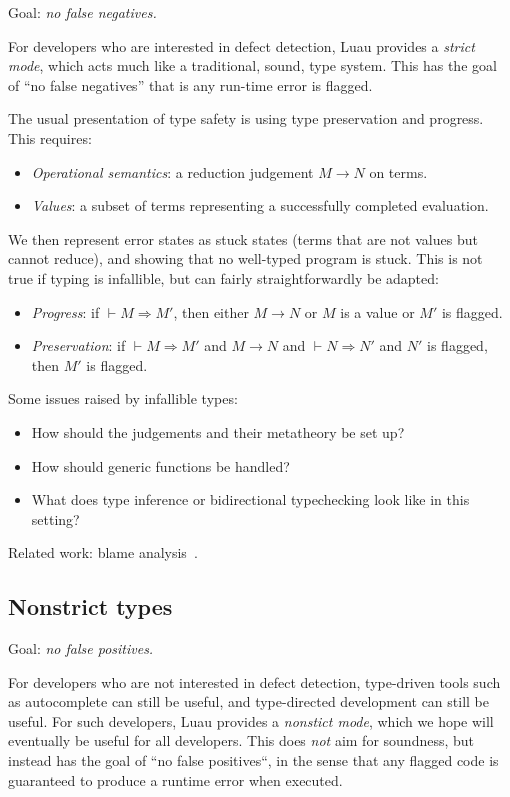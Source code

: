 \documentclass[acmsmall]{acmart}
\begin{document}
Goal: \emph{no false negatives.}

For developers who are interested in defect detection, Luau provides a \emph{strict mode},
which acts much like a traditional, sound, type system. This has the goal of ``no false negatives'' that is any
run-time error is flagged.

The usual presentation of type safety is using type preservation and
progress. This requires:
\begin{itemize}
\item \emph{Operational semantics}: a reduction judgement $M \rightarrow N$ on terms.
\item \emph{Values}: a subset of terms representing a successfully completed evaluation.
\end{itemize}
We then represent error states as stuck states (terms that are not
values but cannot reduce), and showing that no well-typed program is
stuck. This is not true if typing is infallible, but can fairly
straightforwardly be adapted:
\begin{itemize}
\item \emph{Progress}: if ${} \vdash M \Rightarrow M'$, then either $M \rightarrow N$ or $M$ is a value or $M'$ is flagged.
\item \emph{Preservation}: if ${} \vdash M \Rightarrow M'$ and $M \rightarrow N$ and ${} \vdash N \Rightarrow N'$ and $N'$ is flagged, then $M'$ is flagged.
\end{itemize}
Some issues raised by infallible types:
\begin{itemize}
\item How should the judgements and their metatheory be set up?
\item How should generic functions be handled?
\item What does type inference or bidirectional typechecking look like in this setting?
\end{itemize}
Related work: blame analysis~\cite{???}.

\subsection{Nonstrict types}

Goal: \emph{no false positives.}

For developers who are not interested in defect detection, type-driven
tools such as autocomplete can still be useful, and type-directed
development can still be useful. For such developers, Luau provides a
\emph{nonstict mode}, which we hope will eventually be useful for all
developers. This does \emph{not} aim for soundness, but instead has
the goal of ``no false positives``, in the sense that any flagged code
is guaranteed to produce a runtime error when executed.
\end{document}
